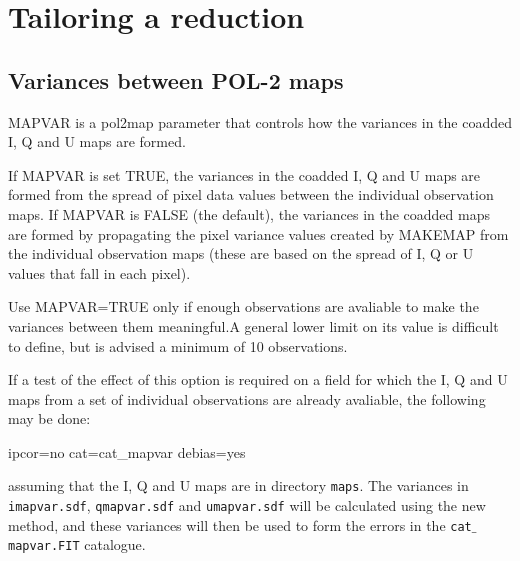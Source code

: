 \section{Tailoring a reduction}

\subsection*{Variances between POL-2 maps}

MAPVAR is a pol2map parameter that controls how the variances in the
coadded I, Q and U maps are formed.

If MAPVAR is set TRUE, the variances in the coadded I, Q and U maps
are formed from the spread of pixel data values between the individual
observation maps. If MAPVAR is FALSE (the default), the variances in
the coadded maps are formed by propagating the pixel variance values
created by MAKEMAP from the individual observation maps (these are
based on the spread of I, Q or U values that fall in each pixel).

Use MAPVAR=TRUE only if enough observations are avaliable to make the
variances between them meaningful.A general lower limit on its value
is difficult to define, but is advised a minimum of 10 observations.


If a test of the effect of this option is required on a field for which
the I, Q and U maps from a set of individual observations are already
avaliable, the following may be done:

\begin{terminalv}
                   ipcor=no cat=cat_mapvar debias=yes
\end{terminalv}

assuming that the I, Q and U maps are in directory \texttt{maps}. The
variances in \texttt{imapvar.sdf}, \texttt{qmapvar.sdf} and
\texttt{umapvar.sdf} will be calculated using the new method, and
these variances will then be used to form the errors in the
\texttt{cat$\_$mapvar.FIT} catalogue.



